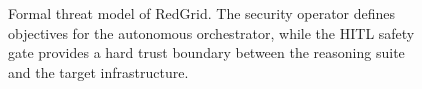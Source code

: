 \begin{figure}[htbp]
  \caption{Formal threat model of RedGrid. The security operator defines objectives for the autonomous orchestrator, while the HITL safety gate provides a hard trust boundary between the reasoning suite and the target infrastructure.}
  \label{fig:threat-model}
\end{figure}
